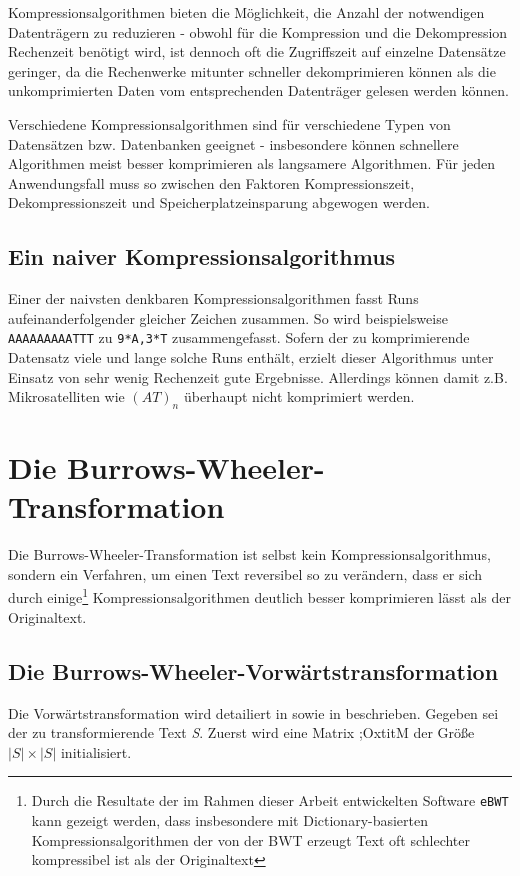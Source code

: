 \documentclass[ngerman,pdftex,paper=A4,DIV=calc,titlepage,12pt]{scrartcl}
\newtheorem[L]{boxedDefinition}{Definition}
\begin{document}
Kompressionsalgorithmen bieten die Möglichkeit, die Anzahl der notwendigen Datenträgern zu reduzieren - obwohl für die Kompression und die Dekompression Rechenzeit benötigt wird, ist dennoch oft die Zugriffszeit auf einzelne Datensätze geringer, da die Rechenwerke mitunter schneller dekomprimieren können als die unkomprimierten Daten vom entsprechenden Datenträger gelesen werden können.

Verschiedene Kompressionsalgorithmen sind für verschiedene Typen von Datensätzen bzw. Datenbanken geeignet - insbesondere können schnellere Algorithmen meist besser komprimieren als langsamere Algorithmen. Für jeden Anwendungsfall muss so zwischen den Faktoren Kompressionszeit, Dekompressionszeit und Speicherplatzeinsparung abgewogen werden.
\subsection{Ein naiver Kompressionsalgorithmus}
Einer der naivsten denkbaren Kompressionsalgorithmen fasst Runs aufeinanderfolgender gleicher Zeichen zusammen.
So wird beispielsweise \texttt{AAAAAAAAATTT} zu \texttt{9*A,3*T} zusammengefasst. Sofern der zu komprimierende Datensatz viele und lange solche Runs enthält, erzielt dieser Algorithmus unter Einsatz von sehr wenig Rechenzeit gute Ergebnisse. Allerdings können damit z.B. Mikrosatelliten wie $(AT)_n$ überhaupt nicht komprimiert werden.
\section{Die Burrows-Wheeler-Transformation}
Die Burrows-Wheeler-Transformation ist selbst kein Kompressionsalgorithmus, sondern ein Verfahren, um einen Text reversibel so zu verändern, dass er sich durch einige\footnote{Durch die Resultate der im Rahmen dieser Arbeit entwickelten Software \texttt{eBWT} kann gezeigt werden, dass insbesondere mit Dictionary-basierten Kompressionsalgorithmen der von der BWT erzeugt Text oft schlechter kompressibel ist als der Originaltext} Kompressionsalgorithmen deutlich besser komprimieren lässt als der Originaltext.
\subsection{Die Burrows-Wheeler-Vorwärtstransformation}\label{ssec:transformation}
Die Vorwärtstransformation wird detailiert in \cite{Heun2003} sowie in \cite[Seite 2 - Algorithmus C]{burrows1994block} beschrieben.
Gegeben sei der zu transformierende Text \textit{S}. Zuerst wird eine Matrix \te;Oxtit{M} der Größe $|S| \times |S|$ initialisiert.
\end{document}
